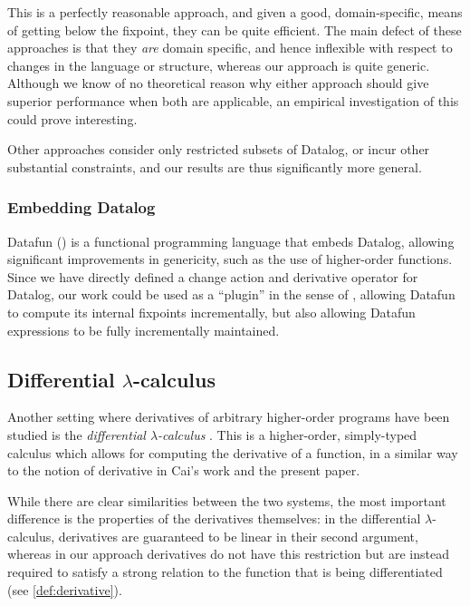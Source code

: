 This is a perfectly reasonable approach, and given a good, domain-specific,
means of getting below the fixpoint, they can be quite efficient.
The main defect of these approaches is that they \emph{are} domain specific,
and hence inflexible with respect to changes in the language or structure,
whereas our approach is quite generic. Although we know of no theoretical reason
why either approach should give superior performance when both are applicable,
an empirical investigation of this could prove interesting.

Other approaches \autocites{dong2000incremental}{urpi1992method} consider only
restricted subsets of Datalog, or incur other substantial constraints, and our results
are thus significantly more general.

\subsubsection{Embedding Datalog}
\label{sec:embeddingDatalog}

Datafun (\textcite{arntz2016datafun}) is a functional programming language that embeds
Datalog, allowing significant improvements in genericity, such as the use of
higher-order functions. Since we have directly defined a change action and
derivative operator for Datalog, our work could be used as a ``plugin'' in the sense
of \citeauthor{cai2014changes}, allowing Datafun to compute its internal fixpoints
incrementally, but also allowing Datafun expressions to be fully incrementally maintained.

\subsection{Differential $\lambda$-calculus}

Another setting where derivatives of arbitrary higher-order programs have been studied
is the \emph{differential $\lambda$-calculus} \autocites{ehrhard2003differential}{ehrhard2017introduction}.
This is a higher-order, simply-typed
calculus which allows for computing the derivative of a function, in a similar
way to the notion of derivative in Cai's work and the present paper.

While there are clear similarities between the two systems, 
the most important difference is the properties of the derivatives themselves:
in the differential $\lambda$-calculus, derivatives are guaranteed to be linear
in their second argument, whereas in our approach derivatives do not have this restriction 
but are instead required to satisfy a strong relation to the function
that is being differentiated (see \cref{def:derivative}).

